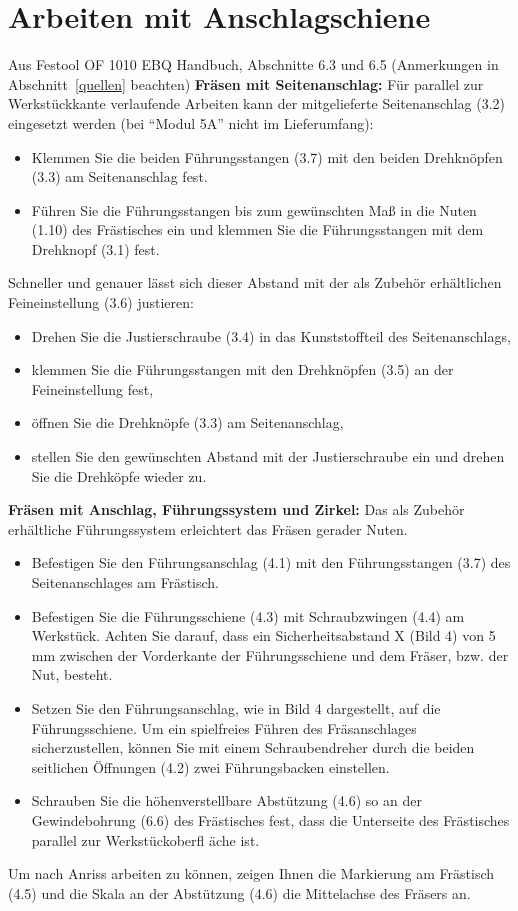 \documentclass{\basedir/fablab-document}
\begin{document}
\section{Arbeiten mit Anschlagschiene}
\begin{leftbar}{Aus Festool OF 1010 EBQ Handbuch, Abschnitte 6.3 und 6.5 (Anmerkungen in Abschnitt~\ref{quellen} beachten)}
\textbf{Fräsen mit Seitenanschlag:}
Für parallel zur Werkstückkante verlaufende
Arbeiten kann der mitgelieferte Seitenanschlag
(3.2) eingesetzt werden (bei ``Modul 5A'' nicht im
Lieferumfang):

\begin{itemize}
    \item Klemmen Sie die beiden Führungsstangen (3.7)
mit den beiden Drehknöpfen (3.3) am Seitenanschlag
fest.
    \item Führen Sie die Führungsstangen bis zum gewünschten
Maß in die Nuten (1.10) des Frästisches
ein und klemmen Sie die Führungsstangen
mit dem Drehknopf (3.1) fest.
\end{itemize}
Schneller und genauer lässt sich dieser Abstand
mit der als Zubehör erhältlichen Feineinstellung
(3.6) justieren:
\begin{itemize}
    \item Drehen Sie die Justierschraube (3.4) in das
Kunststoffteil des Seitenanschlags,
    \item klemmen Sie die Führungsstangen mit den
Drehknöpfen (3.5) an der Feineinstellung fest,
    \item öffnen Sie die Drehknöpfe (3.3) am Seitenanschlag,
    \item stellen Sie den gewünschten Abstand mit der
Justierschraube ein und drehen Sie die Drehköpfe
wieder zu.
\end{itemize}

\textbf{Fräsen mit Anschlag, Führungssystem und Zirkel:}
Das als Zubehör erhältliche Führungssystem
erleichtert das Fräsen gerader Nuten.
\begin{itemize}
    \item Befestigen Sie den Führungsanschlag (4.1) mit
den Führungsstangen (3.7) des Seitenanschlages
am Frästisch.
    \item Befestigen Sie die Führungsschiene (4.3) mit
Schraubzwingen (4.4) am Werkstück. Achten
Sie darauf, dass ein Sicherheitsabstand X (Bild
4) von 5 mm zwischen der Vorderkante der
Führungsschiene und dem Fräser, bzw. der Nut,
besteht.
    \item Setzen Sie den Führungsanschlag, wie in Bild
4 dargestellt, auf die Führungsschiene. Um ein
spielfreies Führen des Fräsanschlages sicherzustellen,
können Sie mit einem Schraubendreher
durch die beiden seitlichen Öffnungen (4.2)
zwei Führungsbacken einstellen.
    \item Schrauben Sie die höhenverstellbare Abstützung
(4.6) so an der Gewindebohrung (6.6) des
Frästisches fest, dass die Unterseite des Frästisches
parallel zur Werkstückoberfl äche ist.
\end{itemize}
Um nach Anriss arbeiten zu können, zeigen Ihnen
die Markierung am Frästisch (4.5) und die Skala
an der Abstützung (4.6) die Mittelachse des Fräsers
an.


\end{leftbar}
\end{document}
